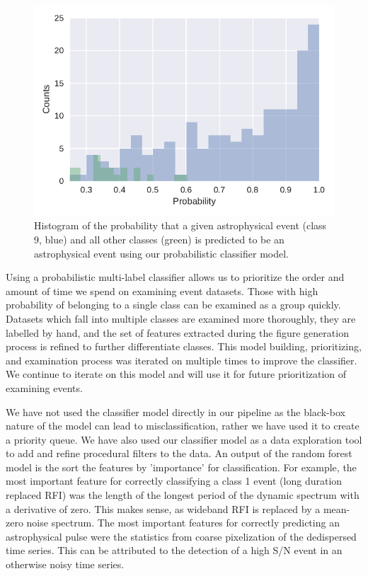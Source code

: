 \documentclass[a4paper,fleqn,usenatbib]{mnras}
\begin{document}
\begin{figure}
    \includegraphics[width=1.0\linewidth]{figures/class9_hist.pdf}
    \caption{Histogram of the probability that a given astrophysical event
    (class 9, blue) and all other classes (green) is predicted to be an
    astrophysical event using our probabilistic classifier model.
    }
    \label{fig:class_hist}
\end{figure}

Using a probabilistic multi-label classifier allows us to prioritize the order
and amount of time we spend on examining event datasets. Those with high
probability of belonging to a single class can be examined as a group quickly.
Datasets which fall into multiple classes are examined more thoroughly, they are
labelled by hand, and the set of features extracted during the figure generation
process is refined to further differentiate classes. This model building,
prioritizing, and examination process was iterated on multiple times to improve
the classifier. We continue to iterate on this model and will use it for future
prioritization of examining events.

We have not used the classifier model directly in our pipeline as the black-box
nature of the model can lead to misclassification, rather we have used it to
create a priority queue.  We have also used our classifier model as a data
exploration tool to add and refine procedural filters to the data.  An output of
the random forest model is the sort the features by 'importance' for
classification. For example, the most important feature for correctly
classifying a class 1 event (long duration replaced RFI) was the length of the
longest period of the dynamic spectrum with a derivative of zero. This makes
sense, as wideband RFI is replaced by a mean-zero noise spectrum. The most
important features for correctly predicting an astrophysical pulse were the
statistics from coarse pixelization of the dedispersed time series. This can be
attributed to the detection of a high S/N event in an otherwise noisy time
series.
\end{document}
